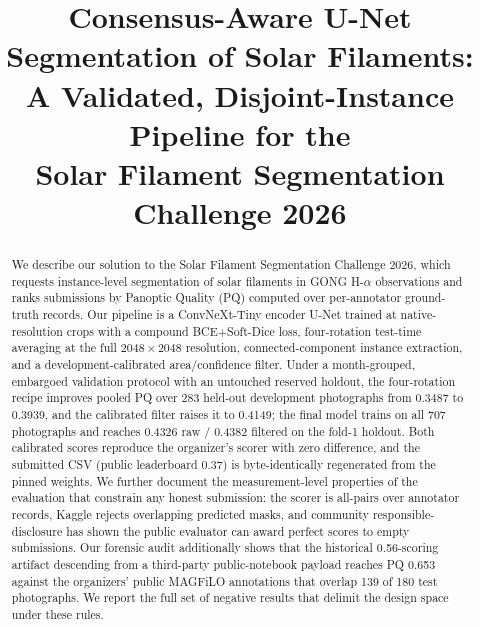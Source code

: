 \documentclass[conference]{IEEEtran}
\begin{document}
\title{Consensus-Aware U-Net Segmentation of Solar Filaments:\\
A Validated, Disjoint-Instance Pipeline for the\\ Solar Filament Segmentation Challenge 2026}

\author{
}

\maketitle

\begin{abstract}
We describe our solution to the Solar Filament Segmentation Challenge 2026, which
requests instance-level segmentation of solar filaments in GONG H-$\alpha$
observations and ranks submissions by Panoptic Quality (PQ) computed over
per-annotator ground-truth records. Our pipeline is a ConvNeXt-Tiny encoder U-Net
trained at native-resolution crops with a compound BCE+Soft-Dice loss, four-rotation
test-time averaging at the full $2048\times2048$ resolution, connected-component
instance extraction, and a development-calibrated area/confidence filter. Under a
month-grouped, embargoed validation protocol with an untouched reserved holdout, the
four-rotation recipe improves pooled PQ over 283 held-out development photographs
from 0.3487 to 0.3939, and the calibrated filter raises it to 0.4149; the final model
trains on all 707 photographs and reaches 0.4326 raw / 0.4382 filtered on the fold-1
holdout. Both calibrated scores reproduce the organizer's scorer with zero difference,
and the submitted CSV (public leaderboard 0.37) is byte-identically regenerated from
the pinned weights. We further document the measurement-level
properties of the evaluation that constrain any honest submission: the scorer is
all-pairs over annotator records, Kaggle rejects overlapping predicted masks, and
community responsible-disclosure has shown the public evaluator can award perfect
scores to empty submissions. Our forensic audit additionally shows that the
historical 0.56-scoring artifact descending from a third-party public-notebook
payload reaches PQ 0.653 against the organizers' public MAGFiLO annotations that
overlap 139 of 180 test photographs. We report the full set of negative results that
delimit the design space under these rules.
\end{abstract}
\end{document}
